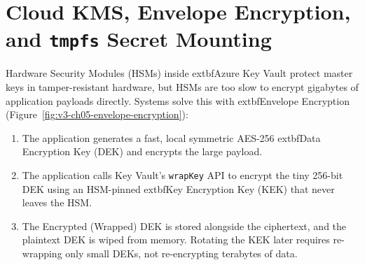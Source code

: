 \section{Cloud KMS, Envelope Encryption, and \texttt{tmpfs} Secret Mounting}

Hardware Security Modules (HSMs) inside 	extbf{Azure Key Vault} protect master keys in tamper-resistant hardware, but HSMs are too slow to encrypt gigabytes of application payloads directly. Systems solve this with 	extbf{Envelope Encryption} (Figure~\ref{fig:v3-ch05-envelope-encryption}):
\begin{enumerate}[leftmargin=15pt]
  \item The application generates a fast, local symmetric AES-256 	extbf{Data Encryption Key (DEK)} and encrypts the large payload.
  \item The application calls Key Vault's \texttt{wrapKey} API to encrypt the tiny 256-bit DEK using an HSM-pinned 	extbf{Key Encryption Key (KEK)} that never leaves the HSM.
  \item The Encrypted (Wrapped) DEK is stored alongside the ciphertext, and the plaintext DEK is wiped from memory. Rotating the KEK later requires re-wrapping only small DEKs, not re-encrypting terabytes of data.
\end{enumerate}

